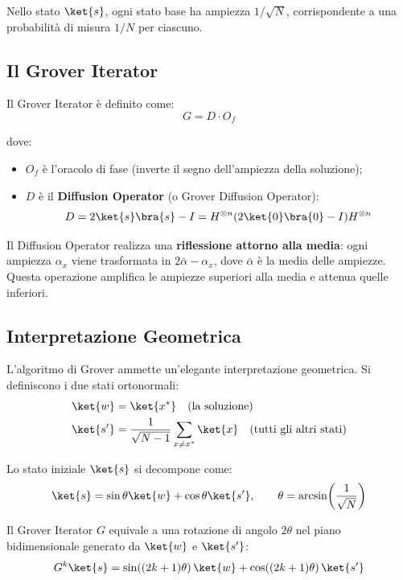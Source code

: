 \begin{onehalfspace}
Nello stato $\ket{s}$, ogni stato base ha ampiezza $1/\sqrt{N}$, corrispondente a una probabilità di misura $1/N$ per ciascuno.

\subsection{Il Grover Iterator}

Il Grover Iterator è definito come:
\begin{equation}
    G = D \cdot O_f
\end{equation}

dove:
\begin{itemize}
    \item $O_f$ è l'oracolo di fase (inverte il segno dell'ampiezza della soluzione);
    \item $D$ è il \textbf{Diffusion Operator} (o Grover Diffusion Operator):
    \begin{equation}
        D = 2\ket{s}\bra{s} - I = H^{\otimes n}(2\ket{0}\bra{0} - I)H^{\otimes n}
    \end{equation}
\end{itemize}

Il Diffusion Operator realizza una \textbf{riflessione attorno alla media}: ogni ampiezza $\alpha_x$ viene trasformata in $2\bar{\alpha} - \alpha_x$, dove $\bar{\alpha}$ è la media delle ampiezze. Questa operazione amplifica le ampiezze superiori alla media e attenua quelle inferiori.

\subsection{Interpretazione Geometrica}

L'algoritmo di Grover ammette un'elegante interpretazione geometrica. Si definiscono i due stati ortonormali:
\begin{align}
    \ket{w}  &= \ket{x^*} \quad \text{(la soluzione)} \\
    \ket{s'} &= \frac{1}{\sqrt{N-1}}\sum_{x \neq x^*}\ket{x} \quad \text{(tutti gli altri stati)}
\end{align}

Lo stato iniziale $\ket{s}$ si decompone come:
\begin{equation}
    \ket{s} = \sin\theta\ket{w} + \cos\theta\ket{s'}, \qquad \theta = \arcsin\!\left(\frac{1}{\sqrt{N}}\right)
\end{equation}

Il Grover Iterator $G$ equivale a una rotazione di angolo $2\theta$ nel piano bidimensionale generato da $\ket{w}$ e $\ket{s'}$:
\begin{equation}
    G^k\ket{s} = \sin\!\left((2k+1)\theta\right)\ket{w} + \cos\!\left((2k+1)\theta\right)\ket{s'}
\end{equation}


\end{onehalfspace}
